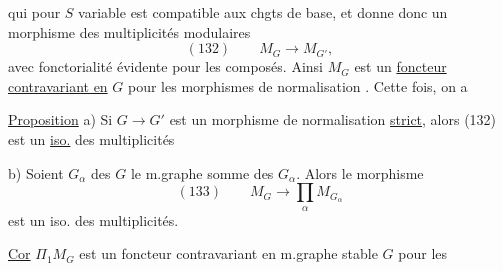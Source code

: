 qui pour $S$ variable est compatible aux chgts de base, et donne donc un morphisme des multiplicités modulaires 
\[
(132)\qquad M_G\longrightarrow M_{G'},
\]
avec fonctorialité évidente pour les composés. Ainsi $M_G$ est un \uline{foncteur contravariant en} $G$ pour les morphismes de normalisation . Cette fois, on a

\uline{Proposition} a) Si $G\longrightarrow G'$ est un morphisme de normalisation \uline{strict}, alors (132) est un \uline{iso.} des multiplicités

b) Soient $G_\alpha$ des   $G$ le m.graphe somme des $G_\alpha$. Alors le morphisme
\[
(133)\qquad M_G\longrightarrow\prod_\alpha M_{G_\alpha}
\]
est un iso. des multiplicités.

\uline{Cor} $\Pi_1M_G$ est un foncteur contravariant en  m.graphe stable $G$  pour les
